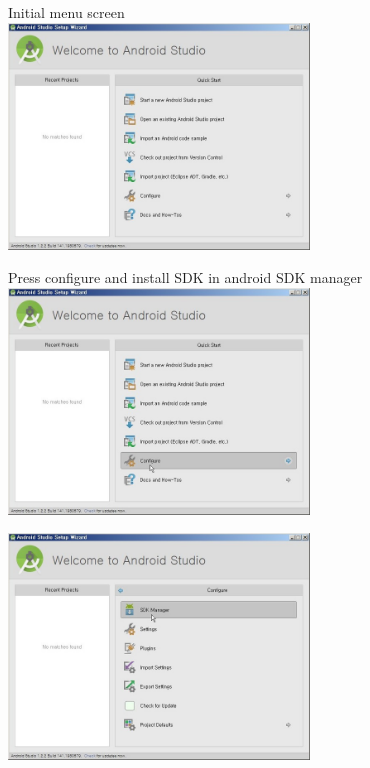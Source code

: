 \documentclass[12pt]{article}
\begin{document}
\begin{center}
Initial menu screen\\ [1\baselineskip]
\includegraphics[width=80mm,scale=1.3]{android10}
\end{center}
\newpage
\begin{center}
Press configure and install SDK in android SDK manager\\ [1\baselineskip]
\includegraphics[width=80mm,scale=1.3]{android11}
\end{center}

\begin{center}
\includegraphics[width=80mm,scale=1.3]{android12}
\end{center}
\end{document}
